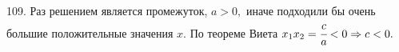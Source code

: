 109. Раз решением является промежуток, $a>0,$ иначе подходили бы очень большие положительные значения $x.$ По теореме Виета $x_1x_2=\cfrac{c}{a}<0\Rightarrow c<0.$\\
